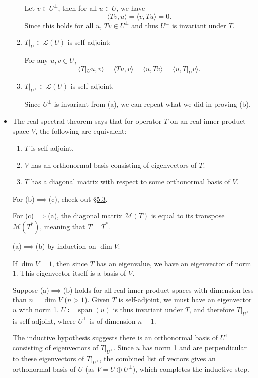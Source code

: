\documentclass[11pt]{article}
\newcommand{\lk}[2]{\hyperlink{subsection.#1.#2}{\S#1.#2}}
\newcommand{\s}{\operatorname{span}}
\renewcommand{\d}{\dim}
\newcommand{\inp}[2]{\langle #1, #2 \rangle}
\newcommand{\M}{\mathcal{M}}
\begin{document}
\begin{itemize}
\begin{enumerate}[label=(\alph*)]
        Let $v \in U^\perp$, then for all $u \in U$, we have \[\inp{Tv}{u}=\inp{v}{Tu}=0.\] Since this holds for all $u$, $Tv \in U^\perp$ and thus $U^\perp$ is invariant under $T$.
        \item $T|_U \in \mathcal{L}(U)$ is self-adjoint;
        
        For any $u,v \in U$,
        \[\inp{T|_U u}{v}=\inp{Tu}{v}=\inp{u}{Tv}=\inp{u}{T|_U v}.\]
        \item $T|_{U^\perp} \in \mathcal{L}(U)$ is self-adjoint.
        
        Since $U^\perp$ is invariant from (a), we can repeat what we did in proving (b).
    \end{enumerate}
    
    \item The real spectral theorem says that for operator $T$ on an real inner product space $V$, the following are equivalent:
    \begin{enumerate}[label=(\alph*)]
        \item $T$ is self-adjoint.
        \item $V$ has an orthonormal basis consisting of eigenvectors of $T$.
        \item $T$ has a diagonal matrix with respect to some orthonormal basis of $V$.
    \end{enumerate}
    
    For (b)$\implies$(c), check out \lk{5}{3}.
    
    For (c)$\implies$(a), the diagonal matrix $\M(T)$ is equal to its transpose $\M(T^*)$, meaning that $T = T^*$.
    
    (a)$\implies$(b) by induction on $\d V$:
    
    If $\d V = 1$, then since $T$ has an eigenvalue, we have an eigenvector of norm 1. This eigenvector itself is a basis of $V$.
    
    Suppose (a)$\implies$(b) holds for all real inner product spaces with dimension less than $n = \d V$ ($n > 1$). Given $T$ is self-adjoint, we must have an eigenvector $u$ with norm 1. $U \coloneqq \s(u)$ is thus invariant under $T$, and therefore $T|_{U^\perp}$ is self-adjoint, where $U^\perp$ is of dimension $n-1$.
    
    The inductive hypothesis suggests there is an orthonormal basis of $U^\perp$ consisting of eigenvectors of $T|_{U^\perp}$. Since $u$ has norm 1 and are perpendicular to these eigenvectors of $T|_{U^\perp}$, the combined list of vectors gives an orthonormal basis of $U$ (as $V=U\oplus U^\perp$), which completes the inductive step.
    
\end{itemize}
\end{document}

